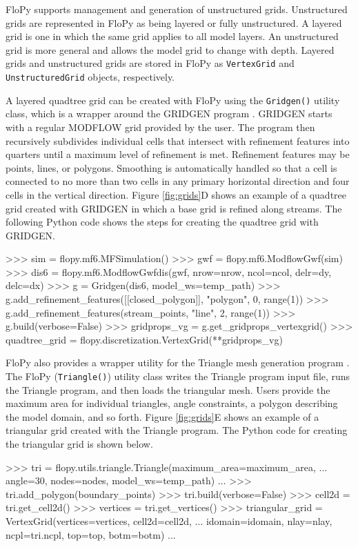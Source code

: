 \documentclass[11pt, oneside]{article}  	%
\begin{document}
FloPy supports management and generation of unstructured grids. Unstructured grids are represented in FloPy as being layered or fully unstructured. A layered grid is one in which the same grid applies to all model layers. An unstructured grid is more general and allows the model grid to change with depth. Layered grids and unstructured grids are stored in FloPy as \texttt{VertexGrid} and \texttt{UnstructuredGrid} objects, respectively.

A layered quadtree grid can be created with FloPy using the \texttt{Gridgen()} utility class, which is a wrapper around the GRIDGEN program \citep{gridgen}. GRIDGEN starts with a regular MODFLOW grid provided by the user. The program then recursively subdivides individual cells that intersect with refinement features into quarters until a maximum level of refinement is met. Refinement features may be points, lines, or polygons. Smoothing is automatically handled so that a cell is connected to no more than two cells in any primary horizontal direction and four cells in the vertical direction.  Figure \ref{fig:grids}D shows an example of a quadtree grid created with GRIDGEN in which a base grid is refined along streams. The following Python code shows the steps for creating the quadtree grid with GRIDGEN.

\begin{python}
>>> sim = flopy.mf6.MFSimulation()
>>> gwf = flopy.mf6.ModflowGwf(sim)
>>> dis6 = flopy.mf6.ModflowGwfdis(gwf, nrow=nrow, ncol=ncol, delr=dy, delc=dx)
>>> g = Gridgen(dis6, model_ws=temp_path)
>>> g.add_refinement_features([[closed_polygon]], "polygon", 0, range(1))
>>> g.add_refinement_features(stream_points, "line", 2, range(1))
>>> g.build(verbose=False)
>>> gridprops_vg = g.get_gridprops_vertexgrid()
>>> quadtree_grid = flopy.discretization.VertexGrid(**gridprops_vg)
\end{python}

FloPy also provides a wrapper utility for the Triangle mesh generation program \citep{trianglemesh}. The FloPy (\texttt{Triangle()}) utility class writes the Triangle program input file, runs the Triangle program, and then loads the triangular mesh. Users provide the maximum area for individual triangles, angle constraints, a polygon describing the model domain, and so forth. Figure \ref{fig:grids}E shows an example of a triangular grid created with the Triangle program. The Python code for creating the triangular grid is shown below.

\begin{python}
>>> tri = flopy.utils.triangle.Triangle(maximum_area=maximum_area, 
... angle=30, nodes=nodes, model_ws=temp_path)
...
>>> tri.add_polygon(boundary_points)
>>> tri.build(verbose=False)
>>> cell2d = tri.get_cell2d()
>>> vertices = tri.get_vertices()
>>> triangular_grid = VertexGrid(vertices=vertices, cell2d=cell2d, 
... idomain=idomain, nlay=nlay, ncpl=tri.ncpl, top=top, botm=botm)
...
\end{python}
\end{document}
